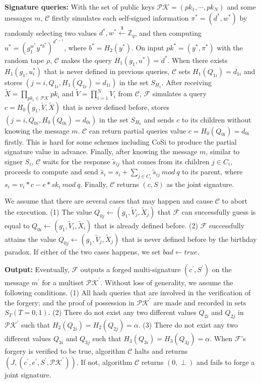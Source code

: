 \documentclass[journal]{IEEEtran}
\begin{document}
\noindent\textbf{Signature queries:} With the set of public keys \(\mathcal{PK}=(pk_1,\cdots,pk_N)\) and some messages \(m\), \(\mathcal{C}\) firstly simulates each self-signed information \(\pi^\ast=(d^\ast,w^\ast)\) by randomly selecting two values \(d^\ast,w^\ast\stackrel{\$}\leftarrow\mathbb{Z}_q\), and then computing \(u^\ast= (g_1^{w^\ast}y^{\ast b^\ast})^{d^{\ast -1}}\), where \(b^\ast= H_2(y^\ast)\). On input \(pk^\ast=(y^\ast,\pi^\ast)\) with the random tape \(\rho\), \(\mathcal{C}\) makes the query \( H_1(g_1,u^\ast)=d^\ast\). When there exists \(H_1(g_1,u_i^\ast)\) that is never defined in previous queries, \(\mathcal{C}\) sets \(H_1(Q_{1i})=d_{1i}\) and stores \((j=i,Q_{1i},H_1(Q_{1i})=d_{1i})\) in the set \(S_{H_1}\). After receiving \(\tilde{X}=\prod_{pk_i\in \mathcal{PK}} pk_i\) and \(\tilde{V}=\prod_{i=1}^N V_i\) from \(\mathcal{C}\), \(\mathcal{F}\) simulates a query \(c= H_0(g_1,\tilde{V},\tilde{X})\) that is never defined before, stores \((j=i,Q_{0i},H_0(Q_{0i})=d_{0i})\) in the set \(S_{H_0}\) and sends \(c\) to its children without knowing the message \(m\).
\(\mathcal{C}\) can return partial queries value \(c=H_0(Q_{0i})=d_{0i}\) firstly. This is hard for some schemes including CoSi to produce the partial signature value in advance.
Finally, after knowing the message \(m\), similar to signer \(S_i\), \(\mathcal{C}\) waits for the response \(\tilde{s}_{ij}\) that comes from its children \(j\in C_i\), proceeds to compute and send \(\tilde{s_i}= s_i+\sum_{j\in {C}_i} \tilde{s}_{ij}\ mod\ q\) to its parent, where \(s_i=v_i *c-e*sk_i\ mod\ q\). Finally, \(\mathcal{C}\) returns \((c,S)\) as the joint signature.

We assume that there are several cases that may happen and cause \(\mathcal{C}\) to abort the execution. (1) The value \(Q_{0j}\leftarrow(g_1,\tilde{V}_j,\tilde{X}_j)\) that \(\mathcal{F}\) can successfully guess is equal to \(Q_{0i}\leftarrow(g_1,\tilde{V}_i,\tilde{X}_i)\) that is already defined before. (2) \(\mathcal{F}\) successfully attains the value \(Q_{0j}\leftarrow(g_1,\tilde{V}_j,\tilde{X}_j)\) that is never defined before by the birthday paradox. If either of the two cases happens, we set \(bad\leftarrow true\).

\noindent\textbf{Output:} Eventually, $\mathcal{F}$ outputs a forged multi-signature $(c^\prime,S^\prime)$ on the message $m^\prime$ for a multiset $\mathcal{PK}^\prime$. Without loss of generality, we assume the following conditions. (1) All hash queries that are involved in the verification of the forgery; and the proof of possession in \(\mathcal{PK}^\prime\) are made and recorded in sets \(S_T(T=0,1)\). (2) There do not exist any two different values \(Q_{2i}\) and \(Q_{2j}\) in \(\mathcal{PK}^\prime\) such that \(H_2(Q_{2i})=H_2(Q_{2j})=\alpha\). (3) There do not exist any two different values \(Q_{3i}\) and \(Q_{3j}\) such that \(H_3(Q_{3i})=H_3(Q_{3j})=\alpha\). When \(\mathcal{F}\)'s forgery is verified to be true, algorithm \(\mathcal{C}\) halts and returns %
\((J,(c^\prime,e^\prime,S^\prime,\mathcal{PK}^\prime))\).
If not, algorithm \(\mathcal{C}\) returns \((0,\perp)\) and fails to forge a joint signature.
\end{document}
